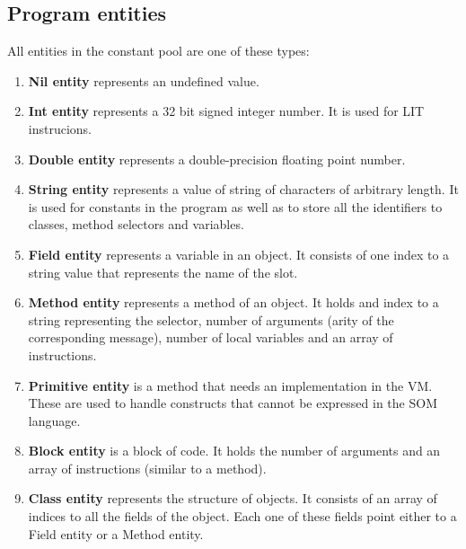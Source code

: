 \documentclass[thesis=M,english]{FITthesis}[2019/12/23]
\begin{document}
\subsection{Program entities}
All entities in the constant pool are one of these types:
\begin{enumerate}
	\item \textbf{Nil entity} represents an undefined value.
	\item \textbf{Int entity} represents a 32 bit signed integer number. It is used for LIT instrucions.
	\item \textbf{Double entity} represents a double-precision floating point number.
	\item \textbf{String entity} represents a value of string of characters of arbitrary length. It is used for
		constants in the program as well as to store all the identifiers to classes, method selectors and variables.
	\item \textbf{Field entity} represents a variable in an object. It consists of one index to a string value that represents
		the name of the slot.
	\item \textbf{Method entity} represents a method of an object. It holds and index to a string representing the selector,
		number of arguments (arity of the corresponding message), number of local variables and an array of instructions.
	\item \textbf{Primitive entity} is a method that needs an implementation in the VM. These are used to handle constructs that
		cannot be expressed in the SOM language. 
	\item \textbf{Block entity} is a block of code. It holds the number of arguments and an array of instructions (similar
		to a method).
	\item \textbf{Class entity} represents the structure of objects. It consists of an array of indices to all the fields
		of the object. Each one of these fields point either to a Field entity or a Method entity.
\end{enumerate}
\end{document}
